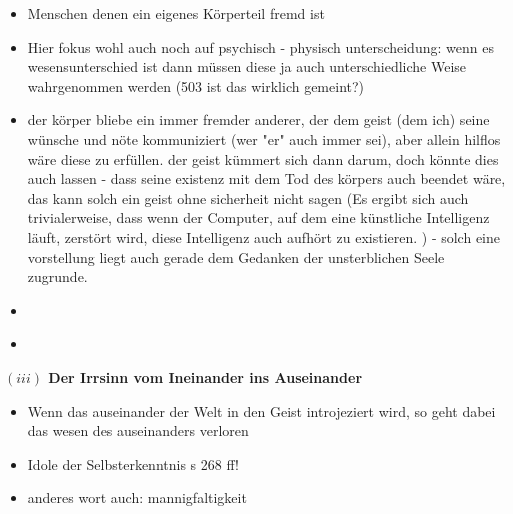 \documentclass[a4paper, 12pt]{article}
\begin{document}
\begin{onehalfspace}
\begin{itemize}
  \item Menschen denen ein eigenes Körperteil fremd ist
   \item Hier fokus wohl auch noch auf psychisch - physisch unterscheidung: wenn es wesensunterschied ist dann müssen diese ja auch unterschiedliche Weise wahrgenommen werden (503 ist das wirklich gemeint?)
  \item der körper bliebe ein immer fremder anderer, der dem geist (dem ich) seine wünsche und nöte kommuniziert (wer "er" auch immer sei), aber allein hilflos wäre diese zu erfüllen. der geist kümmert sich dann darum, doch könnte dies auch lassen - dass seine existenz mit dem Tod des körpers auch beendet wäre, das kann solch ein geist ohne sicherheit nicht sagen (Es ergibt sich auch trivialerweise, dass wenn der Computer, auf dem eine künstliche Intelligenz läuft, zerstört wird, diese Intelligenz auch aufhört zu existieren. ) - solch eine vorstellung liegt auch gerade dem Gedanken der unsterblichen Seele zugrunde. 
  \item 
\end{itemize}



\begin{itemize}
  \item 
\end{itemize}


\vspace{5mm}
\noindent\textbf{$(iii)$ Der Irrsinn vom Ineinander ins Auseinander}


\begin{itemize}
  \item Wenn das auseinander der Welt in den Geist introjeziert wird, so geht dabei das wesen des auseinanders verloren 
  \item Idole der Selbsterkenntnis s 268 ff!
  \item anderes wort auch: mannigfaltigkeit
\end{itemize}




\end{onehalfspace}
\end{document}
